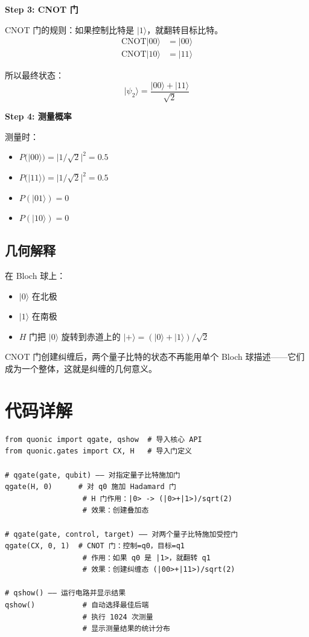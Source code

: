 \documentclass[12pt,a4paper]{article}
\begin{document}
\textbf{Step 3: CNOT 门}

CNOT 门的规则：如果控制比特是 $|1\rangle$，就翻转目标比特。
\begin{align}
\text{CNOT}|00\rangle &= |00\rangle \\
\text{CNOT}|10\rangle &= |11\rangle
\end{align}

所以最终状态：
\begin{equation}
|\psi_2\rangle = \frac{|00\rangle + |11\rangle}{\sqrt{2}}
\end{equation}

\textbf{Step 4: 测量概率}

测量时：
\begin{itemize}
  \item $P(|00\rangle) = |1/\sqrt{2}|^2 = 0.5$
  \item $P(|11\rangle) = |1/\sqrt{2}|^2 = 0.5$
  \item $P(|01\rangle) = 0$
  \item $P(|10\rangle) = 0$
\end{itemize}

\subsection{几何解释}

在 Bloch 球上：
\begin{itemize}
  \item $|0\rangle$ 在北极
  \item $|1\rangle$ 在南极
  \item $H$ 门把 $|0\rangle$ 旋转到赤道上的 $|+\rangle = (|0\rangle+|1\rangle)/\sqrt{2}$
\end{itemize}

CNOT 门创建纠缠后，两个量子比特的状态不再能用单个 Bloch 球描述——它们成为一个整体，这就是纠缠的几何意义。

\section{代码详解}

\begin{lstlisting}[style=python]
from quonic import qgate, qshow  # 导入核心 API
from quonic.gates import CX, H   # 导入门定义

# qgate(gate, qubit) —— 对指定量子比特施加门
qgate(H, 0)      # 对 q0 施加 Hadamard 门
                  # H 门作用：|0> -> (|0>+|1>)/sqrt(2)
                  # 效果：创建叠加态

# qgate(gate, control, target) —— 对两个量子比特施加受控门
qgate(CX, 0, 1)  # CNOT 门：控制=q0，目标=q1
                  # 作用：如果 q0 是 |1>，就翻转 q1
                  # 效果：创建纠缠态 (|00>+|11>)/sqrt(2)

# qshow() —— 运行电路并显示结果
qshow()           # 自动选择最佳后端
                  # 执行 1024 次测量
                  # 显示测量结果的统计分布
\end{lstlisting}
\end{document}

